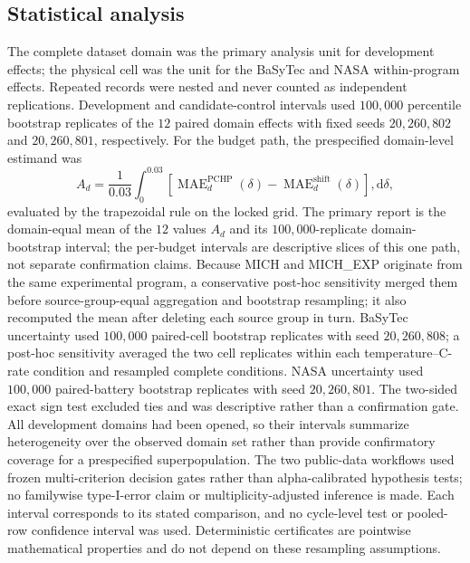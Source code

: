\documentclass[11pt]{article}
\begin{document}
\subsection{Statistical analysis}

The complete dataset domain was the primary analysis unit for development effects; the physical cell was the unit for the BaSyTec and NASA within-program effects. Repeated records were nested and never counted as independent replications. Development and candidate-control intervals used $100{,}000$ percentile bootstrap replicates of the $12$ paired domain effects with fixed seeds $20{,}260{,}802$ and $20{,}260{,}801$, respectively. For the budget path, the prespecified domain-level estimand was
\begin{equation}
A_d=\frac{1}{0.03}\int_{0}^{0.03}
\left[\operatorname{MAE}^{\mathrm{PCHP}}_d(\delta)-
\operatorname{MAE}^{\mathrm{shift}}_d(\delta)\right],\mathrm d\delta,
\label{eq:budget_auc}
\end{equation}
evaluated by the trapezoidal rule on the locked grid. The primary report is the domain-equal mean of the $12$ values $A_d$ and its $100{,}000$-replicate domain-bootstrap interval; the per-budget intervals are descriptive slices of this one path, not separate confirmation claims. Because MICH and MICH\_EXP originate from the same experimental program, a conservative post-hoc sensitivity merged them before source-group-equal aggregation and bootstrap resampling; it also recomputed the mean after deleting each source group in turn. BaSyTec uncertainty used $100{,}000$ paired-cell bootstrap replicates with seed $20{,}260{,}808$; a post-hoc sensitivity averaged the two cell replicates within each temperature--C-rate condition and resampled complete conditions. NASA uncertainty used $100{,}000$ paired-battery bootstrap replicates with seed $20{,}260{,}801$. The two-sided exact sign test excluded ties and was descriptive rather than a confirmation gate. All development domains had been opened, so their intervals summarize heterogeneity over the observed domain set rather than provide confirmatory coverage for a prespecified superpopulation. The two public-data workflows used frozen multi-criterion decision gates rather than alpha-calibrated hypothesis tests; no familywise type-I-error claim or multiplicity-adjusted inference is made. Each interval corresponds to its stated comparison, and no cycle-level test or pooled-row confidence interval was used. Deterministic certificates are pointwise mathematical properties and do not depend on these resampling assumptions.
\end{document}
